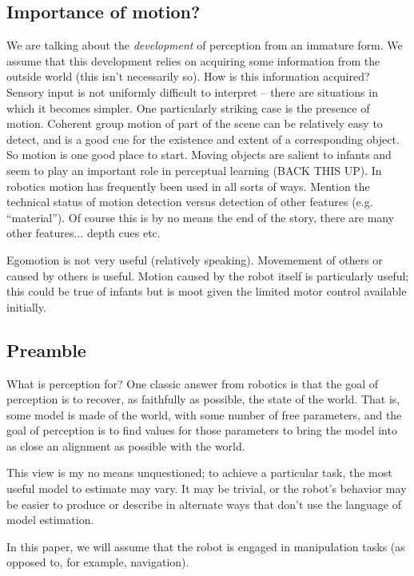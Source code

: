 

\subsection{Importance of motion?}

We are talking about the {\em development} of perception from an
immature form.  We assume that this development relies on acquiring
some information from the outside world (this isn't necessarily so).
How is this information acquired?  Sensory input is not 
uniformly difficult to interpret -- there are situations in
which it becomes simpler.  One particularly striking case is
the presence of motion.  Coherent group motion of part of the 
scene can be relatively easy to detect, and is a good cue for
the existence and extent of a corresponding object.  
So motion is one good place to start.
%
Moving objects are salient to infants and seem to play an
important role in perceptual learning (BACK THIS UP).
%
In robotics motion has frequently been used in all sorts of
ways.
%
Mention the technical status of motion detection versus
detection of other features (e.g. ``material'').
%
Of course this is by no means the end of the story, there 
are many other features... depth cues etc.

Egomotion is not very useful (relatively speaking).  Movemement of
others or caused by others is useful.  Motion caused by the robot
itself is particularly useful; this could be true of infants but is
moot given the limited motor control available initially.

\subsection{Preamble}

What is perception for?  One classic answer from robotics is that the
goal of perception is to recover, as faithfully as possible, the state
of the world.  That is, some model is made of the world, with some
number of free parameters, and the goal of perception is to find
values for those parameters to bring the model into as close an
alignment as possible with the world.

This view is my no means unquestioned; to achieve a particular
task, the most useful model to estimate may vary.  It may be
trivial, or the robot's behavior may be easier to produce or
describe in alternate ways that don't use the language of
model estimation.

In this paper, we will assume that the robot is engaged
in manipulation tasks (as opposed to, for example, navigation).

